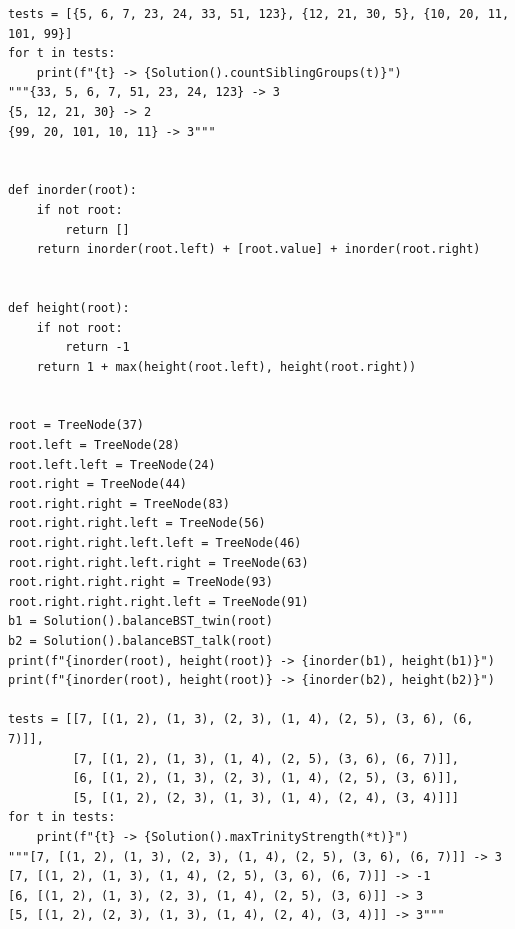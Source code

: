 \documentclass[12pt]{article}
\begin{document}
\begin{verbatim}
tests = [{5, 6, 7, 23, 24, 33, 51, 123}, {12, 21, 30, 5}, {10, 20, 11, 101, 99}]
for t in tests:
    print(f"{t} -> {Solution().countSiblingGroups(t)}")
"""{33, 5, 6, 7, 51, 23, 24, 123} -> 3
{5, 12, 21, 30} -> 2
{99, 20, 101, 10, 11} -> 3"""


def inorder(root):
    if not root:
        return []
    return inorder(root.left) + [root.value] + inorder(root.right)


def height(root):
    if not root:
        return -1
    return 1 + max(height(root.left), height(root.right))


root = TreeNode(37)
root.left = TreeNode(28)
root.left.left = TreeNode(24)
root.right = TreeNode(44)
root.right.right = TreeNode(83)
root.right.right.left = TreeNode(56)
root.right.right.left.left = TreeNode(46)
root.right.right.left.right = TreeNode(63)
root.right.right.right = TreeNode(93)
root.right.right.right.left = TreeNode(91)
b1 = Solution().balanceBST_twin(root)
b2 = Solution().balanceBST_talk(root)
print(f"{inorder(root), height(root)} -> {inorder(b1), height(b1)}")
print(f"{inorder(root), height(root)} -> {inorder(b2), height(b2)}")

tests = [[7, [(1, 2), (1, 3), (2, 3), (1, 4), (2, 5), (3, 6), (6, 7)]],
         [7, [(1, 2), (1, 3), (1, 4), (2, 5), (3, 6), (6, 7)]],
         [6, [(1, 2), (1, 3), (2, 3), (1, 4), (2, 5), (3, 6)]],
         [5, [(1, 2), (2, 3), (1, 3), (1, 4), (2, 4), (3, 4)]]]
for t in tests:
    print(f"{t} -> {Solution().maxTrinityStrength(*t)}")
"""[7, [(1, 2), (1, 3), (2, 3), (1, 4), (2, 5), (3, 6), (6, 7)]] -> 3
[7, [(1, 2), (1, 3), (1, 4), (2, 5), (3, 6), (6, 7)]] -> -1
[6, [(1, 2), (1, 3), (2, 3), (1, 4), (2, 5), (3, 6)]] -> 3
[5, [(1, 2), (2, 3), (1, 3), (1, 4), (2, 4), (3, 4)]] -> 3"""
\end{verbatim}
\newpage
\end{document}
